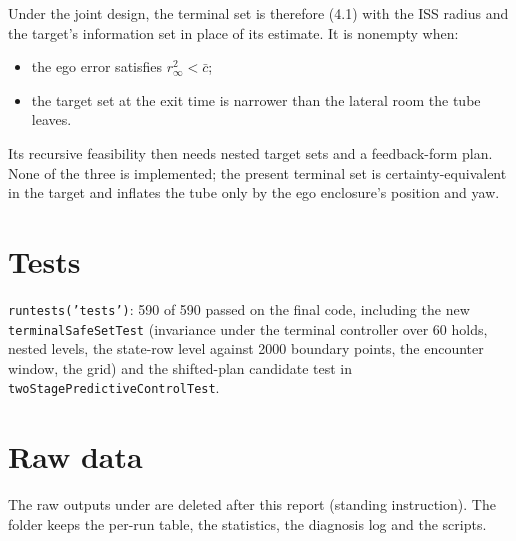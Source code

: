 \documentclass[11pt]{article}
\begin{document}
Under the joint design, the terminal set is therefore (4.1) with the ISS
radius and the target's information set in place of its estimate. It is
nonempty when:
\begin{itemize}
\item the ego error satisfies $r_\infty^2<\bar c$;
\item the target set at the exit time is narrower than the lateral room the
  tube leaves.
\end{itemize}
Its recursive feasibility then needs nested target sets and a feedback-form
plan. None of the three is implemented; the present terminal set is
certainty-equivalent in the target and inflates the tube only by the ego
enclosure's position and yaw.

\section{Tests}
\texttt{runtests('tests')}: 590 of 590 passed on the final code, including
the new \texttt{terminalSafeSetTest} (invariance under the terminal
controller over 60 holds, nested levels, the state-row level against 2000
boundary points, the encounter window, the grid) and the shifted-plan
candidate test in \texttt{twoStagePredictiveControlTest}.

\section{Raw data}
The raw outputs under 
are deleted after this report (standing instruction). The folder
 keeps the per-run
table, the statistics, the diagnosis log and the scripts.
\end{document}
